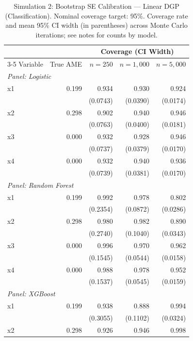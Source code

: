 \documentclass[conference]{IEEEtran}
\begin{document}
	\begin{table}[htbp]
		\centering
		\footnotesize
		\begin{threeparttable}
			\caption{Simulation 2: Bootstrap SE Calibration --- Linear DGP (Classification). Nominal coverage target: 95\%. Coverage rate and mean 95\% CI width (in parentheses) across Monte Carlo iterations; see notes for counts by model.}
			\label{tab:sim2_calibration_linear}
			\begin{tabular}{lrrrr}
				\toprule
				& & \multicolumn{3}{c}{Coverage (CI Width)} \\
				\cmidrule(lr){3-5}
				Variable & True AME & $n=250$ & $n=1,000$ & $n=5,000$ \\
				\midrule
				\multicolumn{5}{l}{\textit{Panel: Logistic}} \\
				\quad x1 & 0.199 & 0.934 & 0.930 & 0.924 \\
				&  & (0.0743) & (0.0390) & (0.0174) \\
				\quad x2 & 0.298 & 0.902 & 0.940 & 0.946 \\
				&  & (0.0763) & (0.0400) & (0.0181) \\
				\quad x3 & 0.000 & 0.932 & 0.928 & 0.946 \\
				&  & (0.0737) & (0.0379) & (0.0170) \\
				\quad x4 & 0.000 & 0.932 & 0.940 & 0.936 \\
				&  & (0.0739) & (0.0381) & (0.0170) \\
				\midrule
				\multicolumn{5}{l}{\textit{Panel: Random Forest}} \\
				\quad x1 & 0.199 & 0.992 & 0.978 & 0.802 \\
				&  & (0.2354) & (0.0872) & (0.0286) \\
				\quad x2 & 0.298 & 0.980 & 0.982 & 0.890 \\
				&  & (0.2740) & (0.1040) & (0.0343) \\
				\quad x3 & 0.000 & 0.996 & 0.970 & 0.962 \\
				&  & (0.1545) & (0.0544) & (0.0158) \\
				\quad x4 & 0.000 & 0.988 & 0.978 & 0.952 \\
				&  & (0.1537) & (0.0545) & (0.0159) \\
				\midrule
				\multicolumn{5}{l}{\textit{Panel: XGBoost}} \\
				\quad x1 & 0.199 & 0.938 & 0.888 & 0.994 \\
				&  & (0.3055) & (0.1102) & (0.0324) \\
				\quad x2 & 0.298 & 0.926 & 0.946 & 0.998 \\

\end{tabular}
\end{threeparttable}
\end{table}
\end{document}
